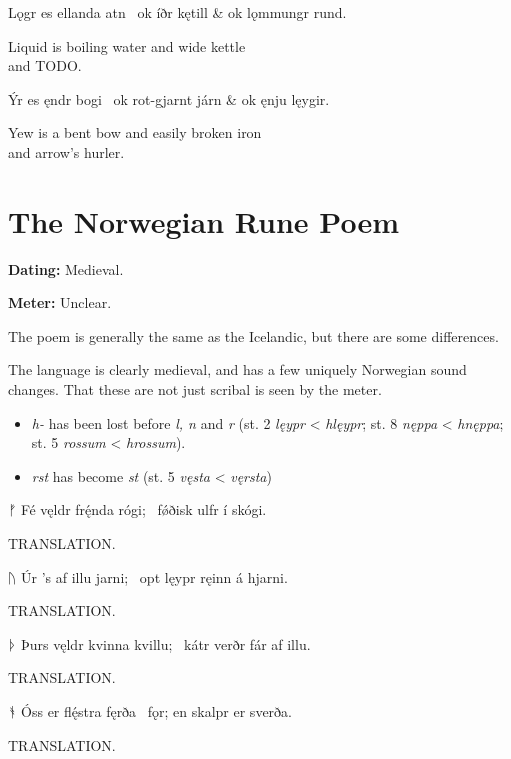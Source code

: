 \bvg\bva Lǫgr es ellanda atn \hld\ ok íðr kętill &
\ind ok lǫmmungr rund.\eva

\bvb Liquid is boiling water and wide kettle \\
and TODO.\evb\evg


\bvg\bva Ýr es ęndr bogi \hld\ ok rot-gjarnt járn &
\ind ok ęnju lęygir.\eva

\bvb Yew is a bent bow and easily broken iron \\
and arrow’s hurler.\evb\evg

\sectionline

\section{The Norwegian Rune Poem}

\begin{flushright}%
\textbf{Dating:} Medieval.%

\textbf{Meter:} Unclear.
\end{flushright}%

The poem is generally the same as the Icelandic, but there are some differences.

The language is clearly medieval, and has a few uniquely Norwegian sound changes.  That these are not just scribal is seen by the meter.
\begin{itemize}
  \item \emph{h-} has been lost before \emph{l, n} and \emph{r} (st. 2 \emph{lęypr} < \emph{hlęypr}; st. 8 \emph{nęppa} < \emph{hnęppa}; st. 5 \emph{rossum} < \emph{hrossum}).
  \item \emph{rst} has become \emph{st} (st. 5 \emph{vęsta} < \emph{vęrsta})
\end{itemize}

\sectionline

\bvg\bva ᚠ Fé vęldr frę́nda rógi; \hld\ fǿðisk ulfr í skógi.\eva

\bvb TRANSLATION.\evb\evg


\bvg\bva ᚢ Úr ’s af illu jarni; \hld\ opt lęypr ręinn á hjarni.\eva

\bvb TRANSLATION.\evb\evg


\bvg\bva ᚦ Þurs vęldr kvinna kvillu; \hld\ kátr verðr fár af illu.\eva

\bvb TRANSLATION.\evb\evg


\bvg\bva ᚬ Óss er flę́stra fęrða \hld\ fǫr; en skalpr er sverða.\eva

\bvb TRANSLATION.\evb\evg


